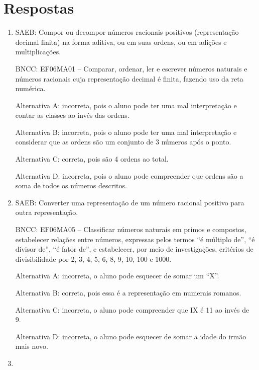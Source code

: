\chapter{Respostas}
\pagestyle{plain}
\footnotesize

\pagecolor{gray!40}


	\begin{enumerate}

	\item

	SAEB: Compor ou decompor números racionais positivos (representação
decimal finita) na forma aditiva, ou em suas ordens, ou em adições e
multiplicações.

BNCC: EF06MA01 -- Comparar, ordenar, ler e escrever números naturais e
números racionais cuja representação decimal é finita, fazendo uso da
reta numérica.

Alternativa A: incorreta, pois o aluno pode ter uma mal interpretação e
contar as classes ao invés das ordens.

Alternativa B: incorreta, pois o aluno pode ter uma mal interpretação e
considerar que as ordens são um conjunto de 3 números após o ponto.

Alternativa C: correta, pois são 4 ordens ao total.

Alternativa D: incorreta, pois o aluno pode compreender que ordens são a
soma de todos os números descritos.

	\item

	SAEB: Converter uma representação de um número racional positivo para
outra representação.

BNCC: EF06MA05 -- Classificar números naturais em primos e compostos,
estabelecer relações entre números, expressas pelos termos ``é múltiplo
de'', ``é divisor de'', ``é fator de'', e estabelecer, por meio de
investigações, critérios de divisibilidade por 2, 3, 4, 5, 6, 8, 9, 10,
100 e 1000.

Alternativa A: incorreta, o aluno pode esquecer de somar um ``X''.

Alternativa B: correta, pois essa é a representação em numerais romanos.

Alternativa C: incorreta, o aluno pode compreender que IX é 11 ao invés
de 9.

Alternativa D: incorreta, o aluno pode esquecer de somar a idade do
irmão mais novo.

	\item


\end{enumerate}
